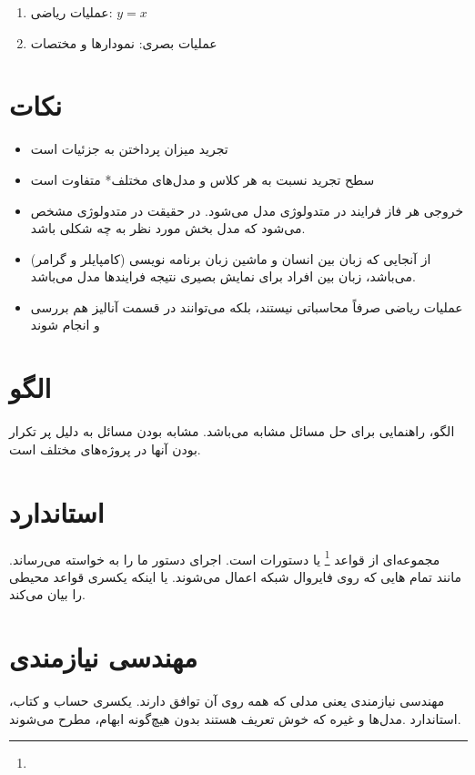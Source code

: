 \documentclass[a4paper]{article}
\begin{document}
\begin{enumerate}
  \item عملیات ریاضی: $y = x$
  \item عملیات بصری: نمودار‌ها و مختصات
\end{enumerate}

\section*{نکات}

\begin{itemize}
  \item تجرید میزان پرداختن به جزئیات است
  \item سطح تجرید نسبت به هر کلاس و مدل‌های مختلف* متفاوت است
  \item خروجی هر فاز فرایند در متدولوژی مدل می‌شود. در حقیقت در متدولوژی مشخص
  می‌شود که مدل بخش مورد نظر به چه شکلی باشد.
  \item از آنجایی که زبان بین انسان و ماشین زبان برنامه نویسی (کامپایلر و گرامر)
  می‌باشد، زبان بین افراد برای نمایش بصیری نتیجه فرایند‌ها مدل می‌باشد.
  \item عملیات ریاضی صرفاً محاسباتی نیستند، بلکه می‌توانند در قسمت آنالیز هم
  بررسی و انجام شوند
\end{itemize}

\section{الگو}

الگو، راهنمایی برای حل مسائل مشابه می‌باشد. مشابه بودن مسائل به دلیل پر تکرار
بودن آنها در پروژه‌های مختلف است.

\section{استاندارد}

مجموعه‌ای از قواعد \footnote{} یا دستورات است. اجرای دستور ما را به
خواسته می‌رساند. مانند تمام  هایی که روی فایروال شبکه اعمال می‌شوند. یا
اینکه یکسری قواعد محیطی را بیان می‌کند.

\section{مهندسی نیازمندی}

مهندسی نیازمندی یعنی مدلی که همه روی آن توافق دارند. یکسری حساب و کتاب،
استاندارد .مدل‌ها و غیره که خوش تعریف هستند بدون هیچ‌گونه ابهام، مطرح می‌شوند.


\end{document}

